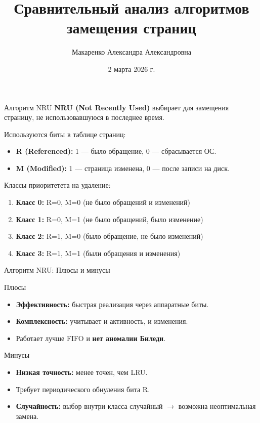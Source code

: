 \documentclass[10pt,pdf,hyperref={unicode}]{beamer}
\title[Алгоритмы замещения]{Сравнительный анализ алгоритмов замещения страниц}
\author[Макаренко А. А.]{Макаренко Александра Александровна}
\institute{НКАбд-07-25}
\date{2 марта 2026 г.}
\begin{document}
\begin{frame}
    \titlepage
\end{frame}


\begin{frame}{Алгоритм NRU}
    \textbf{NRU (Not Recently Used)} выбирает для замещения страницу, не использовавшуюся в последнее время.
    
    \vspace{0.3cm} 
    
    Используются биты в таблице страниц:
    \begin{itemize}
        \item \textbf{R (Referenced):} 1 — было обращение, 0 — сбрасывается ОС.
        \item \textbf{M (Modified):} 1 — страница изменена, 0 — после записи на диск. 
    \end{itemize}

    \begin{block}{Классы приоритетета на удаление:}
        \begin{enumerate}
            \item \textbf{Класс 0:} R=0, M=0 (не было обращений и изменений)
            \item \textbf{Класс 1:} R=0, M=1 (не было обращений, было изменение)
            \item \textbf{Класс 2:} R=1, M=0 (было обращение, не было изменений)
            \item \textbf{Класс 3:} R=1, M=1 (были обращения и изменения)
        \end{enumerate}
    \end{block}
\end{frame}

\begin{frame}{Алгоритм NRU: Плюсы и минусы}
    \begin{block}{Плюсы}
        \begin{itemize}
            \item \textbf{Эффективность:} быстрая реализация через аппаратные биты.
            \item \textbf{Комплексность:} учитывает и активность, и изменения.
            \item Работает лучше FIFO и \textbf{нет аномалии Биледи}.
        \end{itemize}
    \end{block}

    \begin{alertblock}{Минусы}
        \begin{itemize}
            \item \textbf{Низкая точность:} менее точен, чем LRU.
            \item Требует периодического обнуления бита R.
            \item \textbf{Случайность:} выбор внутри класса случайный $\rightarrow$ возможна неоптимальная замена.
        \end{itemize}
    \end{alertblock}
\end{frame}
\end{document}
